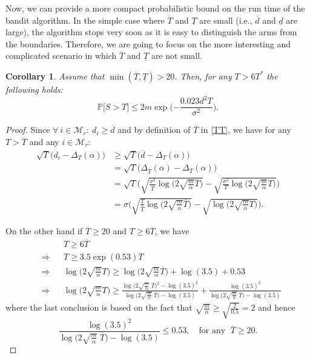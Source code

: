 \documentclass[12pt]{article}
\def\P{\mathbb{P}}
\def\MM{\mathcal{M}}
\def\d{\overline{d}}
\def\dd{\underline{d}}
\def\T{\overline{T}}
\def\TT{\underline{T}}
\newtheorem{corollary}[theorem]{Corollary}
\begin{document}
Now, we can provide a more compact probabilistic bound on the run time of the bandit algorithm. In the simple case where  $\T$ and $\TT$ are small (i.e., $\d$ and $\dd$ are large), the algorithm stops very soon as it is easy to distinguish the arms from the boundaries. Therefore, we are going to focus on the more interesting and complicated scenario in which $\T$ and $\TT$ are not small. 
\begin{corollary}
\label{cor1}
Assume that $\min(\T,\TT)>20$. Then, for any $T>6T^*$ the following holds:
\begin{equation}
\label{cor1eq}
\P\big[S>T\big]\leq 2m \exp\Big({-\frac{0.023d^2 T}{\sigma^2}}\Big).
\end{equation}
\end{corollary}
\begin{proof}
Since $\forall~i\in\MM_r:~d_i\geq \d$  and by definition of $\T$ in \eqref{TT}, we have for any $T>\T$ and any $i\in\MM_r$: 
\begin{equation}
\label{cor1eq2}
\begin{aligned}
\sqrt{T}\big(d_i - \Delta_T(\alpha)\big)& \geq\sqrt{T}\big(\d - \Delta_T(\alpha)\big)\\
& = \sqrt{T}\big(\Delta_{\T}(\alpha) - \Delta_T(\alpha)\big)\\
& = \sqrt{T}\Bigg(\sqrt{\frac{\sigma^2}{\T}\log\bigg(2\sqrt{\frac{m}{\alpha}}\T\bigg)} - \sqrt{\frac{\sigma^2}{T}\log\bigg(2\sqrt{\frac{m}{\alpha}}T\bigg)}\Bigg)\\
& = \sigma \Bigg(\sqrt{\frac{T}{\T}\log\bigg(2\sqrt{\frac{m}{\alpha}}\T\bigg)} - \sqrt{\log\bigg(2\sqrt{\frac{m}{\alpha}}T\bigg)}\Bigg).
\end{aligned}
\end{equation}

On the other hand if $\T\geq 20$ and  $T\geq 6\T$, we have
$$\begin{aligned}
&~&&T\geq 6\T\\
&\Rightarrow && T\geq 3.5\exp(0.53)\T\\
&\Rightarrow && \log\bigg(2\sqrt{\frac{m}{\alpha}}T\bigg)\geq \log\bigg(2\sqrt{\frac{m}{\alpha}}\T\bigg) + \log(3.5) + 0.53\\
&\Rightarrow &&  \log\bigg(2\sqrt{\frac{m}{\alpha}}T\bigg)\geq \frac{\log\bigg(2\sqrt{\frac{m}{\alpha}}\;\T\bigg)^2 - \log(3.5)^2 }{\log\bigg(2\sqrt{\frac{m}{\alpha}}\;\T\bigg) - \log(3.5) } + \frac{\log(3.5)^2}{\log\bigg(2\sqrt{\frac{m}{\alpha}}\;\T\bigg) - \log(3.5) }
\end{aligned}$$
where the last conclusion is based on the fact that $\sqrt{\frac{m}{\alpha}}\geq\sqrt{\frac{2}{0.5}} = 2$ and hence 
%
\begin{equation*}
\frac{\log(3.5)^2}{\log\big(2\sqrt{\frac{m}{\alpha}}\;\T\big) - \log(3.5) }\leq 0.53, \quad\text{for any }\; \T\geq 20. 
\end{equation*}
%


\end{proof}
\end{document}

